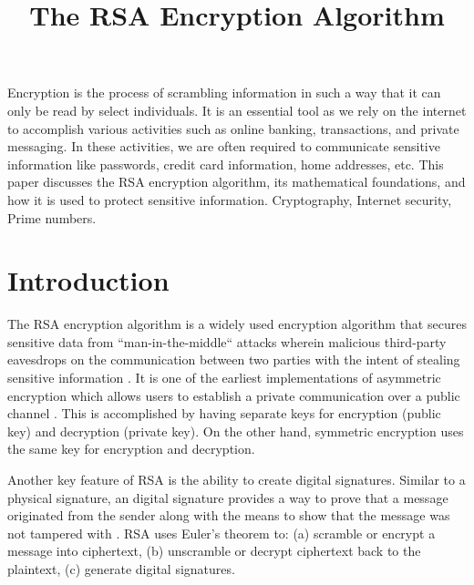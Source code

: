 \documentclass[10pt]{article}
\begin{document}
\noindent



\title{The RSA Encryption Algorithm}


\maketitle


\abstract
Encryption is the process of scrambling information in such a way that it can only be read by select individuals. It is an essential tool as we rely on the internet to accomplish various activities such as online banking, transactions, and private messaging. In these activities, we are often required to communicate sensitive information like passwords, credit card information, home addresses, etc. This paper discusses the RSA encryption algorithm, its mathematical foundations, and how it is used to protect sensitive information.
\keywords
Cryptography, Internet security, Prime numbers.


\section{Introduction}
The RSA encryption algorithm is a widely used encryption algorithm that secures sensitive data from “man-in-the-middle“ attacks wherein malicious third-party eavesdrops on the communication between two parties with the intent of stealing sensitive information \cite{rivest1978method}. It is one of the earliest implementations of asymmetric encryption which allows users to establish a private communication over a public channel \cite{diffie1976new}. This is accomplished by having separate keys for encryption (public key) and decryption (private key). On the other hand, symmetric encryption uses the same key for encryption and decryption.

Another key feature of RSA is the ability to create digital signatures. Similar to a physical signature, an digital signature provides a way to prove that a message originated from the sender along with the means to show that the message was not tampered with \cite{diffie1976new}. RSA uses Euler’s theorem to: (a) scramble or encrypt a message into ciphertext, (b) unscramble or decrypt ciphertext back to the plaintext, (c) generate digital signatures.
\end{document}
